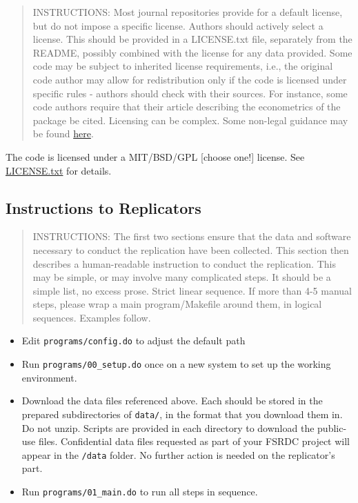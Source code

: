 \documentclass[
]{article}
\providecommand{\tightlist}{%
  \setlength{\itemsep}{0pt}\setlength{\parskip}{0pt}}
\begin{document}
\begin{quote}
INSTRUCTIONS: Most journal repositories provide for a default license,
but do not impose a specific license. Authors should actively select a
license. This should be provided in a LICENSE.txt file, separately from
the README, possibly combined with the license for any data provided.
Some code may be subject to inherited license requirements, i.e., the
original code author may allow for redistribution only if the code is
licensed under specific rules - authors should check with their sources.
For instance, some code authors require that their article describing
the econometrics of the package be cited. Licensing can be complex. Some
non-legal guidance may be found
\href{https://social-science-data-editors.github.io/guidance/Licensing_guidance.html}{here}.
\end{quote}

The code is licensed under a MIT/BSD/GPL {[}choose one!{]} license. See
\href{https://social-science-data-editors.github.io/template_README/LICENSE.txt}{LICENSE.txt}
for details.

\hypertarget{instructions-to-replicators}{%
\subsection{Instructions to
Replicators}\label{instructions-to-replicators}}

\begin{quote}
INSTRUCTIONS: The first two sections ensure that the data and software
necessary to conduct the replication have been collected. This section
then describes a human-readable instruction to conduct the replication.
This may be simple, or may involve many complicated steps. It should be
a simple list, no excess prose. Strict linear sequence. If more than 4-5
manual steps, please wrap a main program/Makefile around them, in
logical sequences. Examples follow.
\end{quote}

\begin{itemize}
\tightlist
\item
  Edit \texttt{programs/config.do} to adjust the default path
\item
  Run \texttt{programs/00\_setup.do} once on a new system to set up the
  working environment.
\item
  Download the data files referenced above. Each should be stored in the
  prepared subdirectories of \texttt{data/}, in the format that you
  download them in. Do not unzip. Scripts are provided in each directory
  to download the public-use files. Confidential data files requested as
  part of your FSRDC project will appear in the \texttt{/data} folder.
  No further action is needed on the replicator's part.
\item
  Run \texttt{programs/01\_main.do} to run all steps in sequence.
\end{itemize}
\end{document}
